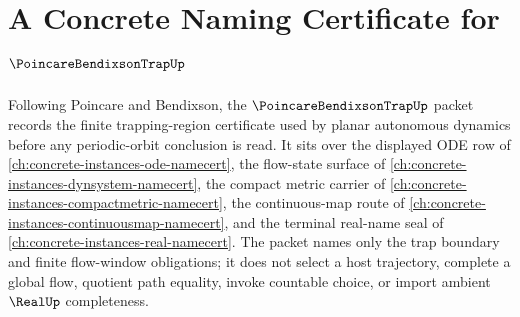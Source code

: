 \chapter{A Concrete Naming Certificate for $\PoincareBendixsonTrapUp$}
\label{ch:concrete-instances-poincare-bendixson-trap-namecert}

Following Poincare and Bendixson, the $\PoincareBendixsonTrapUp$ packet records the finite trapping-region certificate used by planar autonomous dynamics before any periodic-orbit conclusion is read. It sits over the displayed ODE row of \autoref{ch:concrete-instances-ode-namecert}, the flow-state surface of \autoref{ch:concrete-instances-dynsystem-namecert}, the compact metric carrier of \autoref{ch:concrete-instances-compactmetric-namecert}, the continuous-map route of \autoref{ch:concrete-instances-continuousmap-namecert}, and the terminal real-name seal of \autoref{ch:concrete-instances-real-namecert}. The packet names only the trap boundary and finite flow-window obligations; it does not select a host trajectory, complete a global flow, quotient path equality, invoke countable choice, or import ambient $\RealUp$ completeness.

